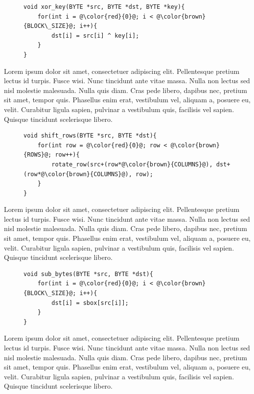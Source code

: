 \begin{figure}[H]
\begin{lstlisting}
void xor_key(BYTE *src, BYTE *dst, BYTE *key){
    for(int i = @\color{red}{0}@; i < @\color{brown}{BLOCK\_SIZE}@; i++){
        dst[i] = src[i] ^ key[i];
    }
}
\end{lstlisting}
\end{figure}

Lorem ipsum dolor sit amet, consectetuer adipiscing elit. Pellentesque pretium lectus id turpis. Fusce wisi. Nunc tincidunt ante vitae massa. Nulla non lectus sed nisl molestie malesuada. Nulla quis diam. Cras pede libero, dapibus nec, pretium sit amet, tempor quis. Phasellus enim erat, vestibulum vel, aliquam a, posuere eu, velit. Curabitur ligula sapien, pulvinar a vestibulum quis, facilisis vel sapien. Quisque tincidunt scelerisque libero.

\begin{figure}[H]
\begin{lstlisting}
void shift_rows(BYTE *src, BYTE *dst){   
    for(int row = @\color{red}{0}@; row < @\color{brown}{ROWS}@; row++){
        rotate_row(src+(row*@\color{brown}{COLUMNS}@), dst+(row*@\color{brown}{COLUMNS}@), row);
    }
}
\end{lstlisting}
\end{figure}

Lorem ipsum dolor sit amet, consectetuer adipiscing elit. Pellentesque pretium lectus id turpis. Fusce wisi. Nunc tincidunt ante vitae massa. Nulla non lectus sed nisl molestie malesuada. Nulla quis diam. Cras pede libero, dapibus nec, pretium sit amet, tempor quis. Phasellus enim erat, vestibulum vel, aliquam a, posuere eu, velit. Curabitur ligula sapien, pulvinar a vestibulum quis, facilisis vel sapien. Quisque tincidunt scelerisque libero.

\begin{figure}[H]
\begin{lstlisting}
void sub_bytes(BYTE *src, BYTE *dst){
    for(int i = @\color{red}{0}@; i < @\color{brown}{BLOCK\_SIZE}@; i++){
        dst[i] = sbox[src[i]];
    }
}
\end{lstlisting}
\end{figure}

Lorem ipsum dolor sit amet, consectetuer adipiscing elit. Pellentesque pretium lectus id turpis. Fusce wisi. Nunc tincidunt ante vitae massa. Nulla non lectus sed nisl molestie malesuada. Nulla quis diam. Cras pede libero, dapibus nec, pretium sit amet, tempor quis. Phasellus enim erat, vestibulum vel, aliquam a, posuere eu, velit. Curabitur ligula sapien, pulvinar a vestibulum quis, facilisis vel sapien. Quisque tincidunt scelerisque libero.

